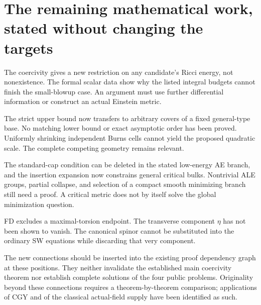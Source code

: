 \documentclass[11pt,a4paper]{article}
\theoremstyle{remark}\newtheorem{remark}[theorem]{Remark}
\begin{document}
\section{The remaining mathematical work, stated without changing the targets}
\begin{description}[leftmargin=0pt,labelwidth=0pt,labelsep=0pt,style=nextline]
\item[Q1: exact Einstein existence.]
The coercivity gives a new restriction on any candidate's Ricci energy, not nonexistence. The formal scalar data show why the listed integral budgets cannot finish the small-blowup case. An argument must use further differential information or construct an actual Einstein metric.
\item[Q2: optimal curvature energy.]
The strict upper bound now transfers to arbitrary covers of a fixed general-type base. No matching lower bound or exact asymptotic order has been proved. Uniformly shrinking independent Burns cells cannot yield the proposed quadratic scale. The complete competing geometry remains relevant.
\item[Q3: smooth global attainment.]
The standard-cap condition can be deleted in the stated low-energy AE branch, and the insertion expansion now constrains general critical bulks. Nontrivial ALE groups, partial collapse, and selection of a compact smooth minimizing branch still need a proof. A critical metric does not by itself solve the global minimization question.
\item[Q4: negative Goldberg.]
FD excludes a maximal-torsion endpoint. The transverse component $\eta$ has not been shown to vanish. The canonical spinor cannot be substituted into the ordinary SW equations while discarding that very component.
\end{description}

The new connections should be inserted into the existing proof dependency graph at these positions. They neither invalidate the established main coercivity theorem nor establish complete solutions of the four public problems. Originality beyond these connections requires a theorem-by-theorem comparison; applications of CGY and of the classical actual-field supply have been identified as such.
\end{document}
